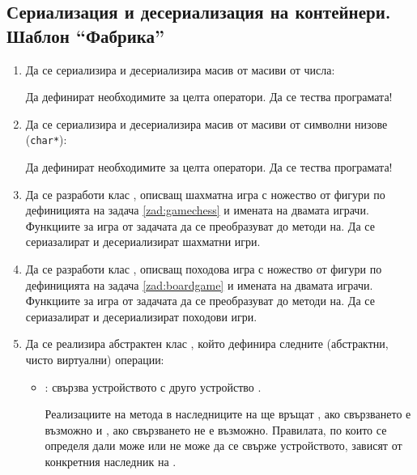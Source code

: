 \pagebreak

\subsection{Сериализация и десериализация на контейнери. Шаблон ``Фабрика''}

\begin{enumerate}[resume]

	\item Да се сериализира и десериализира масив от масиви от числа:


	Да дефинират необходимите за целта оператори. Да се тества програмата!

	\item Да се сериализира и десериализира масив от масиви от символни низове (\texttt{char*}):


	Да дефинират необходимите за целта оператори. Да се тества програмата!

  \item \label{zad:gamechess2}Да се разработи клас , описващ шахматна игра с ножество от фигури по дефиницията на задача \ref{zad:gamechess} и имената на двамата играчи. Функциите за игра от задачата да се преобразуват до методи на. Да се сериазалират и десериализират шахматни игри.

  \item \label{zad:boardgame2}Да се разработи клас , описващ походова игра с ножество от фигури по дефиницията на задача \ref{zad:boardgame} и имената на двамата играчи. Функциите за игра от задачата да се преобразуват до методи на. Да се сериазалират и десериализират походови игри.

	\item \label{zad:network}Да се реализира абстрактен клас , който дефинира следните (абстрактни, чисто виртуални) операции:

	\begin{itemize}
		\item {}: свързва устройството с друго устройство .

		Реализациите на метода в наследниците на  ще връщат , ако свързването е възможно и , ако свързването не е възможно.  Правилата, по които се определя дали може или не може да се свърже устройството, зависят от конкретния наследник на .


\end{itemize}
\end{enumerate}
